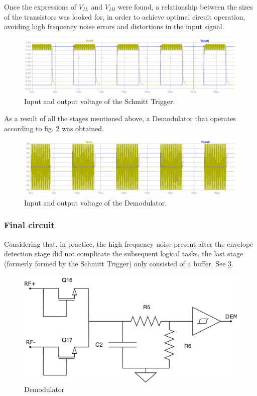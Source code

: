 \documentclass[a4paper, 10pt, conference]{ieeeconf}      %
\begin{document}
Once the expressions of $V_{IL}$ and $V_{IH}$ were found, a relationship between the sizes of the transistors was looked for, in order to achieve optimal circuit operation, avoiding high frequency noise errors and distortions in the input signal. 

\begin{figure}[H]
\centering
\includegraphics[scale=0.2]{Images/ImagenesTesina/Antecedentes/Sim_Schmit.png}
\caption{Input and output voltage of the Schmitt Trigger.}
\label{fig:Sim_Schmit}
\end{figure}

As a result of all the stages mentioned above, a Demodulator that operates according to fig. \ref{fig:Sim_demo} was obtained.

\begin{figure}[H]
\centering
\includegraphics[scale=0.2]{Images/ImagenesTesina/Antecedentes/Sim_Demo.png}
\caption{Input and output voltage of the Demodulator.}
\label{fig:Sim_demo}
\end{figure}


\subsubsection{Final circuit}
Considering that, in practice, the high frequency noise present after the envelope detection stage did not complicate the subsequent logical tasks, the last stage (formerly formed by the Schmitt Trigger) only consisted of a buffer. See  \ref{fig:demod}.

\begin{figure}[H]
\centering
\includegraphics[width=0.7\linewidth]{Images/ImagenesTesina/circuitos/DEM.png}
\caption{Demodulator}
\label{fig:demod}
\end{figure}
\end{document}
